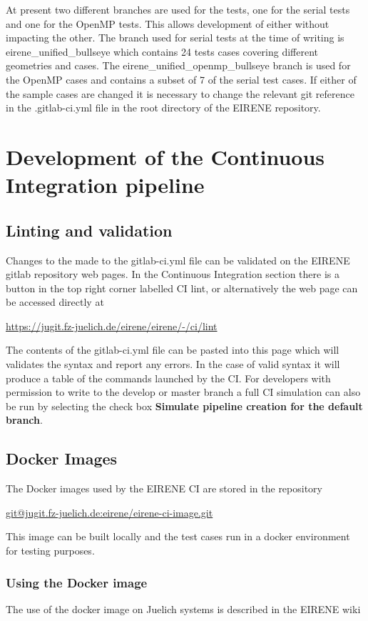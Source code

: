 At present two different branches are used for the tests, one for the serial tests and one for the OpenMP tests. This allows development of either without impacting the other. The branch used for serial tests at the time of writing is {eirene\_unified\_bullseye} which contains 24 tests cases covering different geometries and cases. The {eirene\_unified\_openmp\_bullseye} branch is used for the OpenMP cases and contains a subset of 7 of the serial test cases. If either of the sample cases are changed it is necessary to change the relevant git reference in the {.gitlab-ci.yml} file in the root directory of the EIRENE repository.


\section{Development of the Continuous Integration pipeline}


\subsection{Linting and validation}
Changes to the made to the {gitlab-ci.yml} file can be validated on the EIRENE gitlab repository web pages. In the Continuous Integration section there is a button in the top right corner labelled CI lint, or alternatively the web page can be accessed directly at

\url{https://jugit.fz-juelich.de/eirene/eirene/-/ci/lint}

The contents of the gitlab-ci.yml file can be pasted into this page which will validates the syntax and report any errors. In the case of valid syntax it will produce a table of the commands launched by the CI. For developers with permission to write to the develop or master branch a full CI simulation can also be run by selecting the check box \textbf{Simulate pipeline creation for the default branch}.

\subsection{Docker Images}
\label{loc:DockerImage}
The Docker images used by the EIRENE CI are stored in the repository

\url{git@jugit.fz-juelich.de:eirene/eirene-ci-image.git}

This image can be built locally and the test cases run in a docker environment for testing purposes.

\subsubsection{Using the Docker image}
The use of the docker image on Juelich systems is described in the EIRENE wiki

